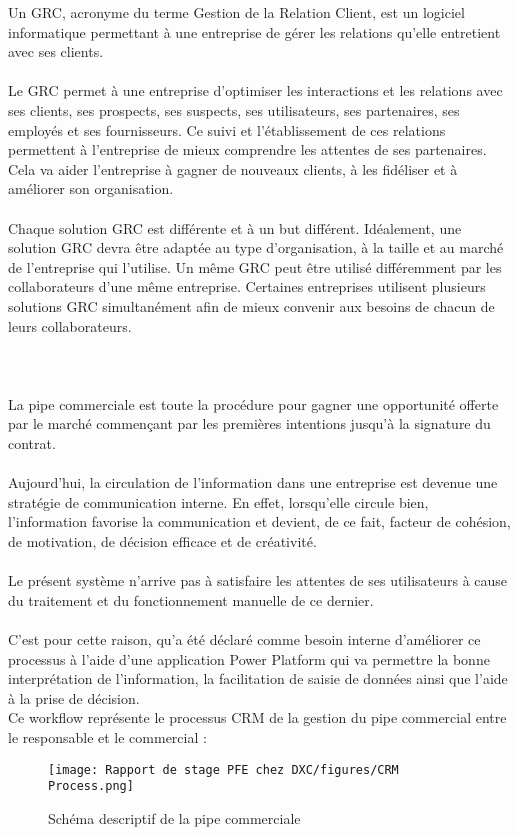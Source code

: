 Un GRC, acronyme du terme Gestion de la Relation Client, est un logiciel informatique permettant à une entreprise de gérer les relations qu’elle entretient avec ses clients.
\\\\
Le GRC permet à une entreprise d’optimiser les interactions et les relations avec ses clients, ses prospects, ses suspects, ses utilisateurs, ses partenaires, ses employés et ses fournisseurs. Ce suivi et l’établissement de ces relations permettent à l’entreprise de mieux comprendre les attentes de ses partenaires. Cela va aider l’entreprise à gagner de nouveaux clients, à les fidéliser et à améliorer son organisation.
\\\\
Chaque solution GRC est différente et à un but différent. Idéalement, une solution GRC devra être adaptée au type d’organisation, à la taille et au marché de l’entreprise qui l’utilise. Un même GRC peut être utilisé différemment par les collaborateurs d’une même entreprise. Certaines entreprises utilisent plusieurs solutions GRC simultanément afin de mieux convenir aux besoins de chacun de leurs collaborateurs.
\\\\
\newpage
\\\\
La pipe commerciale est toute la procédure pour gagner une opportunité offerte par le marché commençant par les premières intentions jusqu’à la signature du contrat.
\\\\
Aujourd’hui, la circulation de l’information dans une entreprise est devenue une stratégie de communication interne. En effet, lorsqu’elle circule bien, l’information favorise la communication et devient, de ce fait, facteur de cohésion, de motivation, de décision efficace et de créativité.
\\\\
Le présent système n’arrive pas à satisfaire les attentes de ses utilisateurs à cause du traitement et du fonctionnement manuelle de ce dernier.
\\\\
C'est pour cette raison, qu'a été déclaré comme besoin interne d'améliorer ce processus à l'aide d'une application Power Platform qui va permettre la bonne interprétation de l'information, la facilitation de saisie de données ainsi que l’aide à la prise de décision.
\\

Ce workflow représente le processus CRM de la gestion du pipe commercial entre le
responsable et le commercial : 


\begin{figure}[!h]
    \centering
    \texttt{[image: Rapport de stage PFE chez DXC/figures/CRM Process.png]}
    \caption{Schéma descriptif de la pipe commerciale}
\end{figure}
